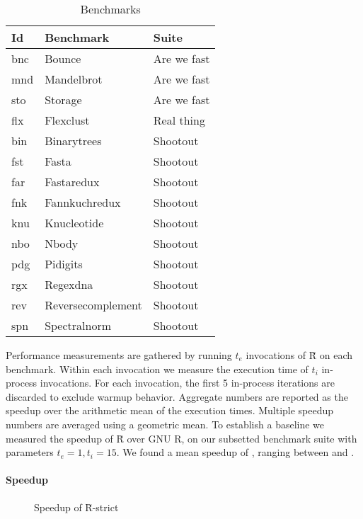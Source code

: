 \documentclass[review,nonacm,screen,acmsmall,anonymous=true]{acmart}
\renewcommand{\Rsh}{{\sf\u R}\xspace}
\newcommand{\Rshstrict}{{\sf\u R-strict}\xspace}
\begin{document}
\begin{wraptable}{r}{7cm}
  \vspace{-3mm}
  \small
  \caption{Benchmarks}\label{table:bms}
  \vspace{-3mm}
  \begin{tabular}{lll}
    \toprule
    \bf Id&\bf Benchmark&\bf Suite\\
    \midrule
    bnc&Bounce&Are we fast\\
    mnd&Mandelbrot&Are we fast\\
    sto&Storage&Are we fast\\
    flx&Flexclust&Real thing\\
    bin&Binarytrees&Shootout\\
    fst&Fasta&Shootout\\
    far&Fastaredux&Shootout\\
    fnk&Fannkuchredux&Shootout\\
    knu&Knucleotide&Shootout\\
    nbo&Nbody&Shootout\\
    pdg&Pidigits&Shootout\\
    rgx&Regexdna&Shootout\\
    rev&Reversecomplement&Shootout\\
    spn&Spectralnorm&Shootout\\
    \bottomrule
  \end{tabular}
\end{wraptable}%

Performance measurements are gathered by running $t_e$ invocations of \Rsh on
each benchmark. Within each invocation we measure the execution time of $t_i$
in-process invocations. For each invocation, the first 5 in-process iterations
are discarded to exclude warmup behavior. Aggregate numbers are reported as the
speedup over the arithmetic mean of the execution times. Multiple speedup
numbers are averaged using a geometric mean. To establish a baseline we measured
the speedup of \Rsh over GNU R, on our subsetted benchmark suite with parameters
$t_e = 1, t_i = 15$. We found a mean speedup of \speedupRsh, ranging between
\speedupRshMin and \speedupRshMax.

\paragraph{Speedup}

\begin{figure}[h]
  \centering
  
  \caption{Speedup of \Rshstrict}
  \label{fig:speedup}
\end{figure}
\end{document}
